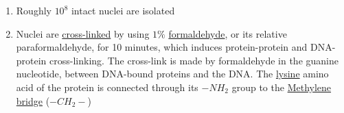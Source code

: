 \documentclass[12pt]{book}
\begin{document}
\begin{enumerate}
 \itemsep1pt  \parskip0pt 
\item Roughly $10^8$ intact nuclei are isolated
\item Nuclei are \href{http://en.wikipedia.org/wiki/Crosslinking_of_DNA}{cross-linked} by using $1\%$
\href{http://en.wikipedia.org/wiki/Formaldehyde}{formaldehyde}, or its relative paraformaldehyde, for 10 minutes, which induces protein-protein and DNA-protein cross-linking. The cross-link is made by formaldehyde in the guanine nucleotide, between DNA-bound proteins and the DNA. The \href{http://en.wikipedia.org/wiki/Lysine}{lysine} amino acid of the protein is connected through its $-NH_2$ group to the \href{http://en.wikipedia.org/wiki/Methylene_bridge}{Methylene bridge} ($-CH_2-$)

\begin{figure}[H]
\end{figure}


\end{enumerate}
\end{document}
